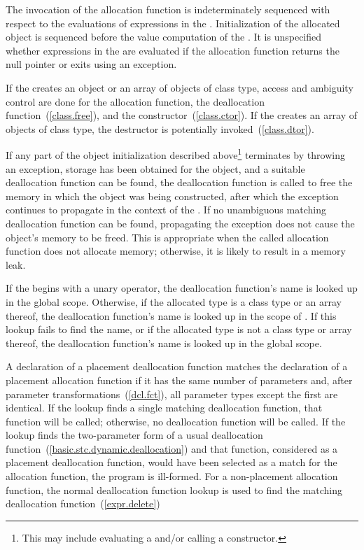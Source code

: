 \pnum
{}%
%
The invocation of the allocation function is indeterminately sequenced with respect to
the evaluations of expressions in the . Initialization of
the allocated object is sequenced before the
%
value computation of the
.
%
It is unspecified whether expressions in the  are
evaluated if the allocation function returns the null pointer or exits
using an exception.

\pnum
If the  creates an object or an array of
objects of class type, access and ambiguity control are done for the
allocation function, the deallocation function~(\ref{class.free}), and
the constructor~(\ref{class.ctor}). If the 
creates an array of objects of class type, the destructor is potentially
invoked~(\ref{class.dtor}).

\pnum
{}%
If any part of the object initialization described above\footnote{This may
include evaluating a  and/or calling
a constructor.}
terminates by throwing an exception, storage has been obtained for the
object, and a suitable deallocation function
can be found, the deallocation function is called to free the memory in
which the object was being constructed, after which the exception
continues to propagate in the context of the .
If no unambiguous matching deallocation function can be found,
propagating the exception does not cause the object's memory to be
freed.
\enternote 
This is appropriate when the called allocation function does not
allocate memory; otherwise, it is likely to result in a memory leak.
\exitnote 

\pnum
If the  begins with a unary \tcode{::}
operator, the deallocation function's name is looked up in the global
scope. Otherwise, if the allocated type is a class type  or an
array thereof, the deallocation function's name is looked up in the
scope of . If this lookup fails to find the name, or if the
allocated type is not a class type or array thereof, the deallocation
function's name is looked up in the global scope.

\pnum
A declaration of a placement deallocation function matches the
declaration of a placement allocation function if it has the same number
of parameters and, after parameter transformations~(\ref{dcl.fct}), all
parameter types except the first are identical. If
the lookup finds a single matching deallocation function, that function
will be called; otherwise, no deallocation function will be called. If
the lookup finds the two-parameter form of a usual deallocation
function~(\ref{basic.stc.dynamic.deallocation}) and that function,
considered as a placement deallocation function, would have been
selected as a match for the allocation function, the program is
ill-formed. For a non-placement allocation function, the normal deallocation
function lookup is used to find the matching deallocation
function~(\ref{expr.delete})
\enterexample

